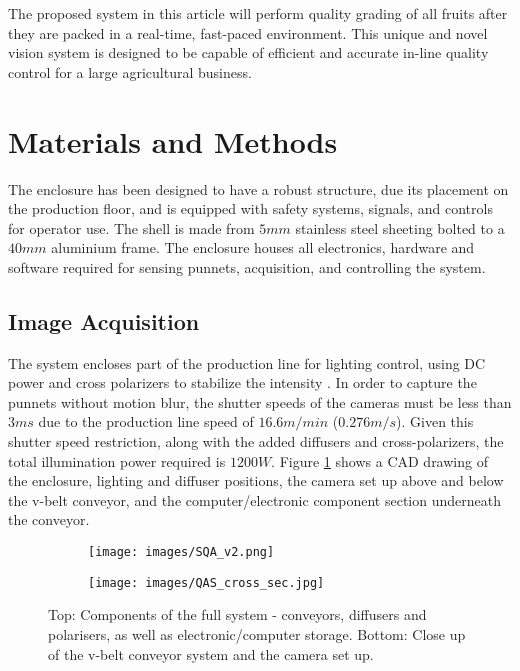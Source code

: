 \documentclass[conference]{IEEEtran}
\begin{document}
The proposed system in this article will perform quality grading of all fruits after they are packed in a real-time, fast-paced environment. This unique and novel vision system is designed to be capable of efficient and accurate in-line quality control for a large agricultural business.   

 



\section{Materials and Methods}
 

The enclosure has been designed to have a robust structure, due its placement on the production floor, and is equipped with safety systems, signals, and controls for operator use. The shell is made from $5mm$ stainless steel sheeting bolted to a $40mm$ aluminium frame. The enclosure houses all electronics, hardware and software required for sensing punnets, acquisition, and controlling the system.




\subsection{Image Acquisition} 


The system encloses part of the production line for lighting control, using DC power and cross polarizers to stabilize the intensity \cite{eaton}. In order to capture the punnets without motion blur, the shutter speeds of the cameras must be less than $3ms$ due to the production line speed of $16.6m/min$ ($0.276m/s$). Given this shutter speed restriction, along with the added diffusers and cross-polarizers, the total illumination power required is $1200W$. Figure \ref{fig:enclosure_cross_sec} shows a CAD drawing of the enclosure, lighting and diffuser positions, the camera set up above and below the v-belt conveyor, and the computer/electronic component section underneath the conveyor.

\begin{figure}[ht]
	\centering
	\begin{subfigure}{.5\textwidth}
		\centering
		\texttt{[image: images/SQA\_v2.png]}
		\caption{}
		\label{fig:enclosure_cross_sec}
	\end{subfigure}%
	
	\vspace{\floatsep}
	
	\begin{subfigure}{.5\textwidth}
		\centering
		\texttt{[image: images/QAS\_cross\_sec.jpg]}
		\caption{}
		\label{fig:close_up_cross_sec}
	\end{subfigure}%
	
	\caption{Top: Components of the full system - conveyors, diffusers and polarisers, as well as electronic/computer storage. Bottom: Close up of the v-belt conveyor system and the camera set up. }
	\label{fig:sample1}
\end{figure}
\end{document}

